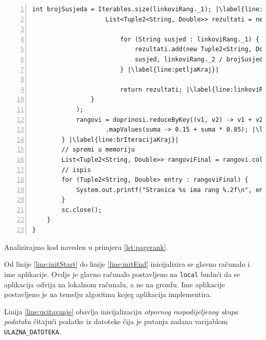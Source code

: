 \documentclass[times, utf8, zavrsni, numeric]{fer}
\begin{document}
\begin{lstlisting}[numbers=left, label={lst:pagerank}, caption={Algoritam \emph{PageRank}.}, escapechar=|]
					int brojSusjeda = Iterables.size(linkoviRang._1); |\label{line:brojSusjeda}|
					List<Tuple2<String, Double>> rezultati = new ArrayList<Tuple2<String, Double>>();
					
						for (String susjed : linkoviRang._1) { |\label{line:petljaStart}|
							rezultati.add(new Tuple2<String, Double>(
							susjed, linkoviRang._2 / brojSusjeda));
						} |\label{line:petljaKraj}|
						
						return rezultati; |\label{line:linkoviRangKraj}|					
				}
			);
			rangovi = doprinosi.reduceByKey((v1, v2) -> v1 + v2) |\label{line:zbrojPoKljucu}|
					.mapValues(suma -> 0.15 + suma * 0.85); |\label{line:postaviRang}|
		} |\label{line:brIteracijaKraj}|
		// spremi u memoriju
		List<Tuple2<String, Double>> rangoviFinal = rangovi.collect(); |\label{line:spremanjePodataka}|
		// ispis
		for (Tuple2<String, Double> entry : rangoviFinal) {
			System.out.printf("Stranica %s ima rang %.2f\n", entry._1, entry._2);
		}
		sc.close();
	}
}
\end{lstlisting}
\vspace{5mm}

Analizirajmo kod naveden u primjeru \ref{lst:pagerank}. 

Od linije \ref{line:initStart} do linije \ref{line:initEnd} inicijalizira se glavno računalo i ime aplikacije. Ovdje je glavno računalo postavljeno na \texttt{local} budući da se aplikacija odvija na lokalnom računalu, a ne na grozdu. Ime aplikacije postavljeno je na temelju algoritma kojeg aplikacija implementira.

Linija \ref{line:ucitavanje} obavlja inicijalizaciju \emph{otpornog raspodijeljenog skupa podataka} čitajući podatke iz datoteke čija je putanja zadana varijablom \texttt{ULAZNA\_DATOTEKA}.
\end{document}
